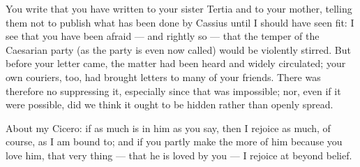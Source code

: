  You write that you have written to your sister Tertia and to your mother, telling them not to publish what has been done by Cassius until I should have seen fit: I see that you have been afraid --- and rightly so --- that the temper of the Caesarian party (as the party is even now called) would be violently stirred. But before your letter came, the matter had been heard and widely circulated; your own couriers, too, had brought letters to many of your friends. There was therefore no suppressing it, especially since that was impossible; nor, even if it were possible, did we think it ought to be hidden rather than openly spread.

 About my Cicero: if as much is in him as you say, then I rejoice as much, of course, as I am bound to; and if you partly make the more of him because you love him, that very thing --- that he is loved by you --- I rejoice at beyond belief.
